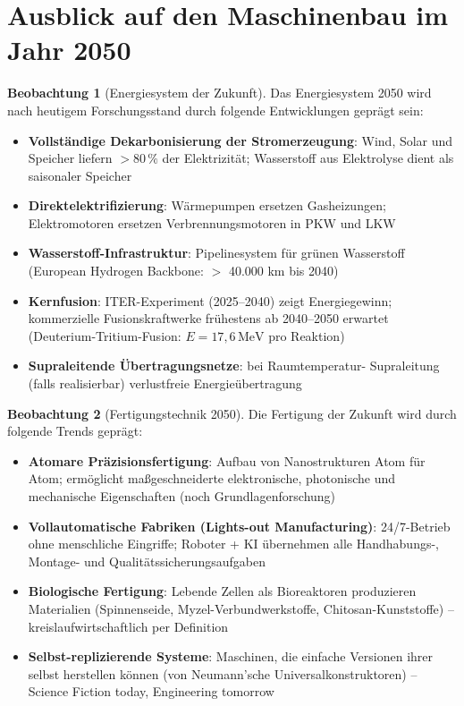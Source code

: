 ﻿\documentclass[a4paper,12pt]{report}
\theoremstyle{definition}
\newtheorem{beobachtung}{Beobachtung}
\begin{document}
\section{Ausblick auf den Maschinenbau im Jahr 2050}

\begin{beobachtung}[Energiesystem der Zukunft]
Das Energiesystem 2050 wird nach heutigem Forschungsstand durch
folgende Entwicklungen geprägt sein:
\begin{itemize}
    \item[-] \textbf{Vollständige Dekarbonisierung der Stromerzeugung}:
          Wind, Solar und Speicher liefern $> 80\,\%$ der Elektrizität;
          Wasserstoff aus Elektrolyse dient als saisonaler Speicher
    \item[-] \textbf{Direktelektrifizierung}: Wärmepumpen ersetzen Gasheizungen;
          Elektromotoren ersetzen Verbrennungsmotoren in PKW und LKW
    \item[-] \textbf{Wasserstoff-Infrastruktur}: Pipelinesystem für grünen
          Wasserstoff (European Hydrogen Backbone: $>$ 40.000 km bis 2040)
    \item[-] \textbf{Kernfusion}: ITER-Experiment (2025--2040) zeigt Energiegewinn;
          kommerzielle Fusionskraftwerke frühestens ab 2040--2050 erwartet
          (Deuterium-Tritium-Fusion: $E = 17{,}6\,\mathrm{MeV}$ pro Reaktion)
    \item[-] \textbf{Supraleitende Übertragungsnetze}: bei Raumtemperatur-
          Supraleitung (falls realisierbar) verlustfreie Energieübertragung
\end{itemize}
\end{beobachtung}

\begin{beobachtung}[Fertigungstechnik 2050]
Die Fertigung der Zukunft wird durch folgende Trends geprägt:
\begin{itemize}
    \item[-] \textbf{Atomare Präzisionsfertigung}: Aufbau von Nanostrukturen
          Atom für Atom; ermöglicht maßgeschneiderte elektronische, photonische
          und mechanische Eigenschaften (noch Grundlagenforschung)
    \item[-] \textbf{Vollautomatische Fabriken (Lights-out Manufacturing)}:
          24/7-Betrieb ohne menschliche Eingriffe; Roboter + KI übernehmen
          alle Handhabungs-, Montage- und Qualitätssicherungsaufgaben
    \item[-] \textbf{Biologische Fertigung}: Lebende Zellen als Bioreaktoren
          produzieren Materialien (Spinnenseide, Myzel-Verbundwerkstoffe,
          Chitosan-Kunststoffe) -- kreislaufwirtschaftlich per Definition
    \item[-] \textbf{Selbst-replizierende Systeme}: Maschinen, die einfache
          Versionen ihrer selbst herstellen können (von Neumann'sche
          Universalkonstruktoren) -- Science Fiction today, Engineering tomorrow
\end{itemize}
\end{beobachtung}
\end{document}
